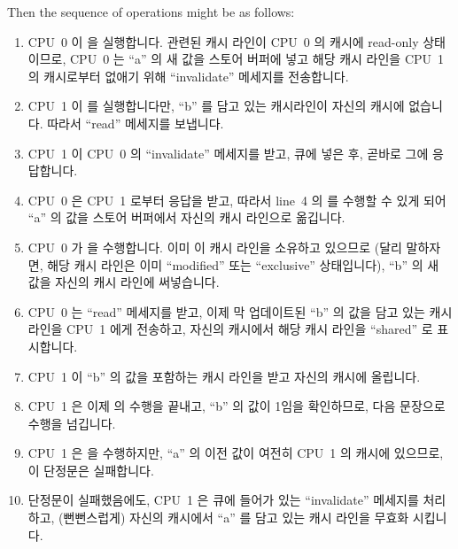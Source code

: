 Then the sequence of operations might be as follows:
\fi
\begin{enumerate}
\item	CPU~0 이  을 실행합니다.
	관련된 캐시 라인이 CPU~0 의 캐시에 read-only 상태이므로, CPU~0 는 ``a''
	의 새 값을 스토어 버퍼에 넣고 해당 캐시 라인을 CPU~1 의 캐시로부터
	없애기 위해 ``invalidate'' 메세지를 전송합니다.
\item	CPU~1 이  를 실행합니다만, ``b'' 를 담고
	있는 캐시라인이 자신의 캐시에 없습니다.
	따라서 ``read'' 메세지를 보냅니다.
\item	CPU~1 이 CPU~0 의 ``invalidate'' 메세지를 받고, 큐에 넣은 후, 곧바로
	그에 응답합니다.
\item	CPU~0 은 CPU~1 로부터 응답을 받고, 따라서 line~4 의  를
	수행할 수 있게 되어 ``a'' 의 값을 스토어 버퍼에서 자신의 캐시 라인으로
	옮깁니다.

\item	CPU~0 가  을 수행합니다.
	이미 이 캐시 라인을 소유하고 있으므로 (달리 말하자면, 해당 캐시 라인은
	이미 ``modified'' 또는 ``exclusive'' 상태입니다), ``b'' 의 새 값을
	자신의 캐시 라인에 써넣습니다.
\item	CPU~0 는 ``read'' 메세지를 받고, 이제 막 업데이트된 ``b'' 의 값을 담고
	있는 캐시 라인을 CPU~1 에게 전송하고, 자신의 캐시에서 해당 캐시 라인을
	``shared'' 로 표시합니다.
\item	CPU~1 이 ``b'' 의 값을 포함하는 캐시 라인을 받고 자신의 캐시에
	올립니다.
\item	CPU~1 은 이제  의 수행을 끝내고, ``b'' 의
	값이 1임을 확인하므로, 다음 문장으로 수행을 넘깁니다.
\item	CPU~1 은  을 수행하지만, ``a'' 의 이전 값이 여전히
	CPU~1 의 캐시에 있으므로, 이 단정문은 실패합니다.
\item	단정문이 실패했음에도, CPU~1 은 큐에 들어가 있는 ``invalidate''
	메세지를 처리하고, (뻔뻔스럽게) 자신의 캐시에서 ``a'' 를 담고 있는 캐시
	라인을 무효화 시킵니다.
\iffalse


\end{enumerate}
